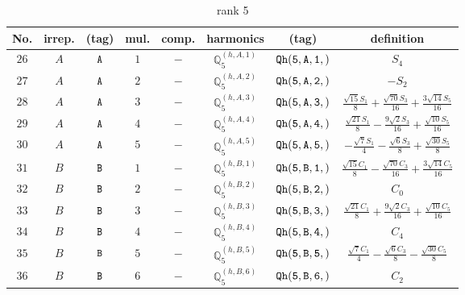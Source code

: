 \documentclass[fleqn,8pt]{jsarticle}
\begin{document}
\begin{table}[ht!]
\begin{center}
\caption{rank 5}
\renewcommand{\arraystretch}{1.3}
\begin{tabular}{cccccccc} \hline \hline
No. & irrep. & (tag) & mul. & comp. & harmonics & (tag) & definition \\ \hline
$ 26 $ & $ A $ & $ {\tt A} $ & $ 1 $ & $ - $ & $ \mathbb{Q}_{5}^{(h,A,1)} $ & $ {\tt Qh(5,A,1,)} $ & $ S_{4} $ \\
$ 27 $ & $ A $ & $ {\tt A} $ & $ 2 $ & $ - $ & $ \mathbb{Q}_{5}^{(h,A,2)} $ & $ {\tt Qh(5,A,2,)} $ & $ - S_{2} $ \\
$ 28 $ & $ A $ & $ {\tt A} $ & $ 3 $ & $ - $ & $ \mathbb{Q}_{5}^{(h,A,3)} $ & $ {\tt Qh(5,A,3,)} $ & $ \frac{\sqrt{15} S_{1}}{8} + \frac{\sqrt{70} S_{3}}{16} + \frac{3 \sqrt{14} S_{5}}{16} $ \\
$ 29 $ & $ A $ & $ {\tt A} $ & $ 4 $ & $ - $ & $ \mathbb{Q}_{5}^{(h,A,4)} $ & $ {\tt Qh(5,A,4,)} $ & $ \frac{\sqrt{21} S_{1}}{8} - \frac{9 \sqrt{2} S_{3}}{16} + \frac{\sqrt{10} S_{5}}{16} $ \\
$ 30 $ & $ A $ & $ {\tt A} $ & $ 5 $ & $ - $ & $ \mathbb{Q}_{5}^{(h,A,5)} $ & $ {\tt Qh(5,A,5,)} $ & $ - \frac{\sqrt{7} S_{1}}{4} - \frac{\sqrt{6} S_{3}}{8} + \frac{\sqrt{30} S_{5}}{8} $ \\
$ 31 $ & $ B $ & $ {\tt B} $ & $ 1 $ & $ - $ & $ \mathbb{Q}_{5}^{(h,B,1)} $ & $ {\tt Qh(5,B,1,)} $ & $ \frac{\sqrt{15} C_{1}}{8} - \frac{\sqrt{70} C_{3}}{16} + \frac{3 \sqrt{14} C_{5}}{16} $ \\
$ 32 $ & $ B $ & $ {\tt B} $ & $ 2 $ & $ - $ & $ \mathbb{Q}_{5}^{(h,B,2)} $ & $ {\tt Qh(5,B,2,)} $ & $ C_{0} $ \\
$ 33 $ & $ B $ & $ {\tt B} $ & $ 3 $ & $ - $ & $ \mathbb{Q}_{5}^{(h,B,3)} $ & $ {\tt Qh(5,B,3,)} $ & $ \frac{\sqrt{21} C_{1}}{8} + \frac{9 \sqrt{2} C_{3}}{16} + \frac{\sqrt{10} C_{5}}{16} $ \\
$ 34 $ & $ B $ & $ {\tt B} $ & $ 4 $ & $ - $ & $ \mathbb{Q}_{5}^{(h,B,4)} $ & $ {\tt Qh(5,B,4,)} $ & $ C_{4} $ \\
$ 35 $ & $ B $ & $ {\tt B} $ & $ 5 $ & $ - $ & $ \mathbb{Q}_{5}^{(h,B,5)} $ & $ {\tt Qh(5,B,5,)} $ & $ \frac{\sqrt{7} C_{1}}{4} - \frac{\sqrt{6} C_{3}}{8} - \frac{\sqrt{30} C_{5}}{8} $ \\
$ 36 $ & $ B $ & $ {\tt B} $ & $ 6 $ & $ - $ & $ \mathbb{Q}_{5}^{(h,B,6)} $ & $ {\tt Qh(5,B,6,)} $ & $ C_{2} $ \\
 \hline \hline
\end{tabular}
\end{center}
\end{table}
\end{document}
